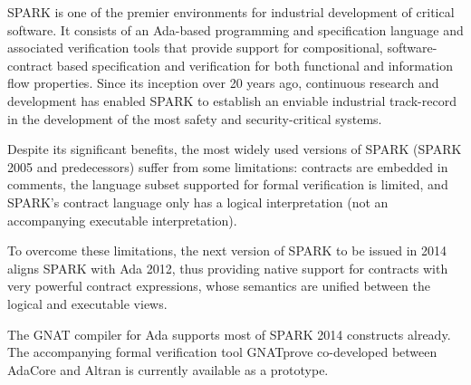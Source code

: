 \label{SPARK2014OVERVIEW}

SPARK is one of the premier environments for industrial development of critical
software. It consists of an Ada-based programming and specification language
and associated verification tools that provide support for compositional,
software-contract based specification and verification for both functional and
information flow properties. Since its inception over 20 years ago, continuous
research and development has enabled SPARK to establish an enviable industrial
track-record in the development of the most safety and security-critical
systems.

Despite its significant benefits, the most widely used versions of SPARK (SPARK
2005 and predecessors) suffer from some limitations: contracts are embedded in
comments, the language subset supported for formal verification is limited, and
SPARK's contract language only has a logical interpretation (not an
accompanying executable interpretation).

To overcome these limitations, the next version of SPARK to be issued in 2014
aligns SPARK with Ada 2012, thus providing native support for contracts with
very powerful contract expressions, whose semantics are unified between the
logical and executable views.

The GNAT compiler for Ada supports most of SPARK 2014 constructs already.
The accompanying formal verification tool GNATprove co-developed between
AdaCore and Altran is currently available as a prototype.
